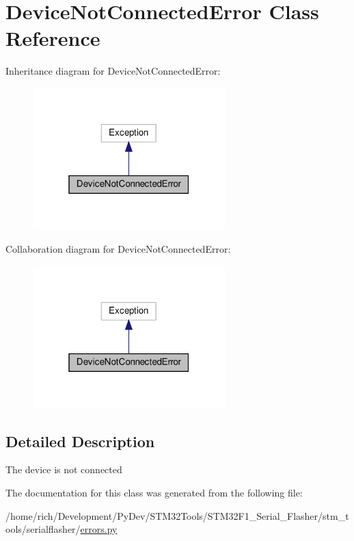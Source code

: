 \hypertarget{classstm__tools_1_1serialflasher_1_1errors_1_1DeviceNotConnectedError}{}\section{Device\+Not\+Connected\+Error Class Reference}
\label{classstm__tools_1_1serialflasher_1_1errors_1_1DeviceNotConnectedError}


Inheritance diagram for Device\+Not\+Connected\+Error\+:
\nopagebreak
\begin{figure}[H]
\begin{center}
\leavevmode
\includegraphics[width=211pt]{classstm__tools_1_1serialflasher_1_1errors_1_1DeviceNotConnectedError__inherit__graph}
\end{center}
\end{figure}


Collaboration diagram for Device\+Not\+Connected\+Error\+:
\nopagebreak
\begin{figure}[H]
\begin{center}
\leavevmode
\includegraphics[width=211pt]{classstm__tools_1_1serialflasher_1_1errors_1_1DeviceNotConnectedError__coll__graph}
\end{center}
\end{figure}


\subsection{Detailed Description}
\begin{DoxyVerb}The device is not connected\end{DoxyVerb}
 

The documentation for this class was generated from the following file\+:\begin{DoxyCompactItemize}
\item 
/home/rich/\+Development/\+Py\+Dev/\+S\+T\+M32\+Tools/\+S\+T\+M32\+F1\+\_\+\+Serial\+\_\+\+Flasher/stm\+\_\+tools/serialflasher/\hyperlink{errors_8py}{errors.\+py}\end{DoxyCompactItemize}
